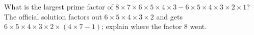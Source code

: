 What is the largest prime factor of $8\times7\times6\times5\times4\times3-6\times5\times4\times3\times2\times1$? The official solution factors out $6\times5\times4\times3\times2$ and gets $6\times5\times4\times3\times2\times(4\times7-1)$; explain where the factor $8$ went.
